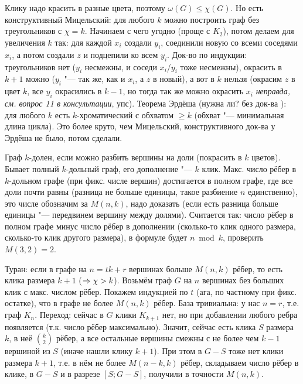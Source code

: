 \section{} %
	Клику надо красить в разные цвета, поэтому $\omega(G) \le \chi(G)$.
	Но есть конструктивный Мицельский: для любого $k$ можно построить граф без треугольников с $\chi=k$.
	Начинаем с чего угодно (проще с $K_2$), потом делаем для увеличения $k$ так: для каждой $x_i$ создали $y_i$, соединили новую со всеми соседями $x_i$,
	а потом создали $z$ и подцепили ко всем $y_i$.
	Док-во по индукции: треугольников нет ($y_i$ несмежны, и соседи $x_i$/$y_i$ тоже несмежны),
	окрасить в $k+1$ можно ($y_i$ "--- так же, как и $x_i$, а $z$ в новый),
	а вот в $k$ нельзя (окрасим $z$ в цвет $k$, все $y_i$ окрасились в $k-1$, но тогда так же можно окрасить $x_i$ \TODO\textit{неправда, см. вопрос 11 в консультации}, упс).
	Теорема Эрдёша (нужна ли? без док-ва \TODO): для любого $k$ есть $k$-хроматический с обхватом $\ge k$ (обхват "--- минимальная длина цикла).
	Это более круто, чем Мицельский, конструктивного док-ва у Эрдёша не было, потом сделали.

	Граф $k$-долен, если можно разбить вершины на доли (покрасить в $k$ цветов).
	Бывает полный $k$-дольный граф, его дополнение "--- $k$ клик.
	Макс. число рёбер в $k$-дольном графе (при фикс. числе вершин) достигается в полном графе, где все доли почти равны (разница не больше единицы,
	такое разбиение $n$ единственно), это числе обозначим за $M(n, k)$, надо доказать (если есть разница больше единицы "--- передвинем вершину между долями).
	Считается так: число рёбер в полном графе минус число рёбер в дополнении (сколько-то клик одного размера, сколько-то клик другого размера),
	в формуле будет $n \bmod k$, проверить $M(3, 2)=2$.

	Туран: если в графе на $n=tk+r$ вершинах больше $M(n, k)$ рёбер, то есть клика размера $k+1$ ($\Rightarrow \chi>k$).
	Возьмём граф $G$ на $n$ вершинах без больших клик с макс. числом рёбер.
	Покажем индукцией по $t$ (ага, по частному при фикс. остатке), что в графе не более $M(n,k)$ рёбер.
	База тривиальна: у нас $n=r$, т.е. граф $K_n$.
	Переход: сейчас в $G$ клики $K_{k+1}$ нет, но при добавлении любого ребра появляется (т.к. число рёбер максимально).
	Значит, сейчас есть клика $S$ размера $k$, в неё $\binom{k}{2}$ рёбер, а все остальные вершины смежны с не более чем $k-1$ вершиной из $S$ (иначе нашли клику $k+1$).
	При этом в $G-S$ тоже нет клики размера $k+1$, т.е. в нём не более $M(n-k,k)$ рёбер, складываем число рёбер в клике, в $G-S$ и в разрезе $[S;G-S]$, получили в точности $M(n,k)$.
